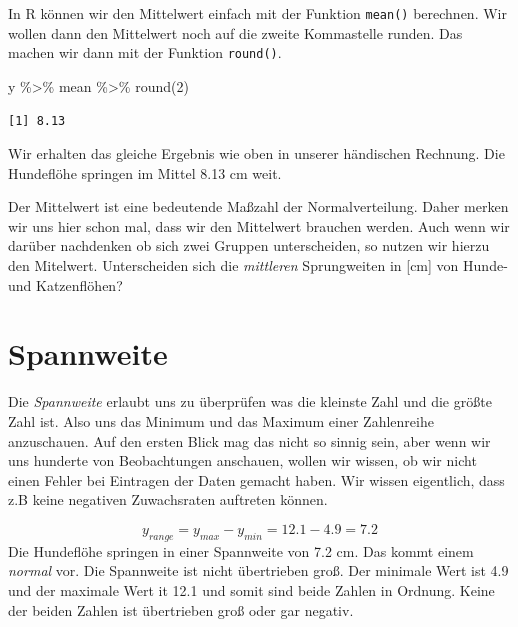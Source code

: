 \documentclass[
  letterpaper,
]{scrbook}
\newenvironment{Shaded}{\begin{snugshade}}{\end{snugshade}}
\newcommand{\DecValTok}[1]{\textcolor[rgb]{0.68,0.00,0.00}{#1}}
\newcommand{\FunctionTok}[1]{\textcolor[rgb]{0.28,0.35,0.67}{#1}}
\newcommand{\NormalTok}[1]{\textcolor[rgb]{0.00,0.23,0.31}{#1}}
\newcommand{\SpecialCharTok}[1]{\textcolor[rgb]{0.37,0.37,0.37}{#1}}
\begin{document}
In R können wir den Mittelwert einfach mit der Funktion \texttt{mean()}
berechnen. Wir wollen dann den Mittelwert noch auf die zweite
Kommastelle runden. Das machen wir dann mit der Funktion
\texttt{round()}.

\begin{Shaded}
\begin{Highlighting}[]
\NormalTok{y }\SpecialCharTok{\%\textgreater{}\%}\NormalTok{ mean }\SpecialCharTok{\%\textgreater{}\%} \FunctionTok{round}\NormalTok{(}\DecValTok{2}\NormalTok{)}
\end{Highlighting}
\end{Shaded}

\begin{verbatim}
[1] 8.13
\end{verbatim}

Wir erhalten das gleiche Ergebnis wie oben in unserer händischen
Rechnung. Die Hundeflöhe springen im Mittel 8.13 cm weit.

Der Mittelwert ist eine bedeutende Maßzahl der Normalverteilung. Daher
merken wir uns hier schon mal, dass wir den Mittelwert brauchen werden.
Auch wenn wir darüber nachdenken ob sich zwei Gruppen unterscheiden, so
nutzen wir hierzu den Mitelwert. Unterscheiden sich die \emph{mittleren}
Sprungweiten in {[}cm{]} von Hunde- und Katzenflöhen?

\hypertarget{spannweite}{%
\section{Spannweite}\label{spannweite}}

Die \emph{Spannweite} erlaubt uns zu überprüfen was die kleinste Zahl
und die größte Zahl ist. Also uns das Minimum und das Maximum einer
Zahlenreihe anzuschauen. Auf den ersten Blick mag das nicht so sinnig
sein, aber wenn wir uns hunderte von Beobachtungen anschauen, wollen wir
wissen, ob wir nicht einen Fehler bei Eintragen der Daten gemacht haben.
Wir wissen eigentlich, dass z.B keine negativen Zuwachsraten auftreten
können.

{}

\[
y_{range} = y_{max} - y_{min} = 12.1 - 4.9 = 7.2
\] Die Hundeflöhe springen in einer Spannweite von 7.2 cm. Das kommt
einem \emph{normal} vor. Die Spannweite ist nicht übertrieben groß. Der
minimale Wert ist 4.9 und der maximale Wert it 12.1 und somit sind beide
Zahlen in Ordnung. Keine der beiden Zahlen ist übertrieben groß oder gar
negativ.
\end{document}
